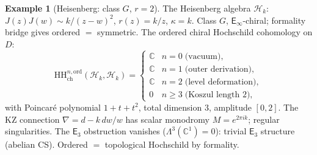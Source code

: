 \documentclass[11pt,reqno]{amsart}
\theoremstyle{definition}
\newtheorem{example}[theorem]{Example}
\theoremstyle{remark}
\newcommand{\cH}{\mathcal{H}}
\newcommand{\HH}{\mathrm{HH}}
\providecommand{\Ethree}{\mathsf{E}_{3}}
\newcommand{\Einf}{\mathsf{E}_{\infty}}
\newcommand{\CC}{\mathbb{C}}
\numberwithin{equation}{section}
\begin{document}
\begin{example}[Heisenberg: class $G$, $r = 2$]
\label{ex:heisenberg}
The Heisenberg algebra $\cH_k$: $J(z)J(w) \sim k/(z-w)^2$,
$r(z) = k/z$, $\kappa = k$.
Class $G$, $\Einf$-chiral; formality bridge gives
ordered $=$ symmetric.
The ordered chiral Hochschild cohomology on $D$:
\begin{equation}\label{eq:heis-hh-summary}
\HH^{n,\mathrm{ord}}_{\mathrm{ch}}(\cH_k, \cH_k) =
\begin{cases}
\CC & n = 0 \;\text{(vacuum)}, \\
\CC & n = 1 \;\text{(outer derivation)}, \\
\CC & n = 2 \;\text{(level deformation)}, \\
0 & n \geq 3 \;\text{(Koszul length $2$)},
\end{cases}
\end{equation}
with Poincar\'e polynomial $1 + t + t^2$, total dimension
$3$, amplitude $[0,2]$. The KZ connection
$\nabla = d - k\,dw/w$ has scalar monodromy
$M = e^{2\pi i k}$; regular singularities. The $\Ethree$
obstruction vanishes ($\Lambda^3(\CC^1) = 0$): trivial
$\Ethree$ structure (abelian CS). Ordered $=$ topological Hochschild by formality.
\end{example}
\end{document}
